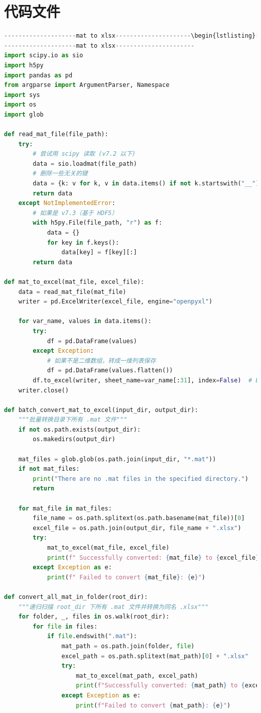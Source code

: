 \documentclass[a4paper]{CPIPC}
\numberwithin{equation}{section}
\begin{document}
\section{代码文件}
\begin{lstlisting}[language=Python]%设置不同语言即可。
--------------------mat to xlsx---------------------\begin{lstlisting}[language=Python, caption=MAT to XLSX Converter]
--------------------mat to xlsx----------------------
import scipy.io as sio
import h5py
import pandas as pd
from argparse import ArgumentParser, Namespace
import sys
import os
import glob

def read_mat_file(file_path):
    try:
        # 尝试用 scipy 读取 (v7.2 以下)
        data = sio.loadmat(file_path)
        # 删除一些无关的键
        data = {k: v for k, v in data.items() if not k.startswith("__")}
        return data
    except NotImplementedError:
        # 如果是 v7.3（基于 HDF5）
        with h5py.File(file_path, "r") as f:
            data = {}
            for key in f.keys():
                data[key] = f[key][:]
        return data

def mat_to_excel(mat_file, excel_file):
    data = read_mat_file(mat_file)
    writer = pd.ExcelWriter(excel_file, engine="openpyxl")

    for var_name, values in data.items():
        try:
            df = pd.DataFrame(values)
        except Exception:
            # 如果不是二维数组，转成一维列表保存
            df = pd.DataFrame(values.flatten())
        df.to_excel(writer, sheet_name=var_name[:31], index=False)  # Excel sheet名最长31
    writer.close()

def batch_convert_mat_to_excel(input_dir, output_dir):
    """批量转换目录下所有 .mat 文件"""
    if not os.path.exists(output_dir):
        os.makedirs(output_dir)

    mat_files = glob.glob(os.path.join(input_dir, "*.mat"))
    if not mat_files:
        print("There are no .mat files in the specified directory.")
        return

    for mat_file in mat_files:
        file_name = os.path.splitext(os.path.basename(mat_file))[0]
        excel_file = os.path.join(output_dir, file_name + ".xlsx")
        try:
            mat_to_excel(mat_file, excel_file)
            print(f" Successfully converted: {mat_file} to {excel_file}")
        except Exception as e:
            print(f" Failed to convert {mat_file}: {e}")

def convert_all_mat_in_folder(root_dir):
    """递归扫描 root_dir 下所有 .mat 文件并转换为同名 .xlsx"""
    for folder, _, files in os.walk(root_dir):
        for file in files:
            if file.endswith(".mat"):
                mat_path = os.path.join(folder, file)
                excel_path = os.path.splitext(mat_path)[0] + ".xlsx"
                try:
                    mat_to_excel(mat_path, excel_path)
                    print(f"Successfully converted: {mat_path} to {excel_path}")
                except Exception as e:
                    print(f"Failed to convert {mat_path}: {e}")


\end{lstlisting}
\end{document}
